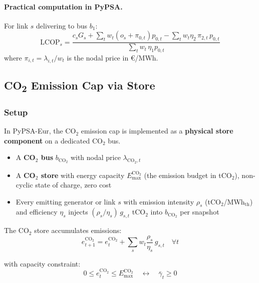 \documentclass{article}
\begin{document}
\paragraph{Practical computation in PyPSA.}
For link $s$ delivering to bus $b_1$:
\begin{equation}
    \text{LCOP}_s =
    \frac{c_s G_s + \displaystyle\sum_t w_t (o_s + \pi_{0,t}) p_{0,t}
          - \displaystyle\sum_t w_t \eta_2\, \pi_{2,t}\, p_{0,t}}
         {\displaystyle\sum_t w_t\, \eta_1 p_{0,t}}
\end{equation}
where $\pi_{i,t} = \lambda_{i,t}/w_t$ is the nodal price in \euro/MWh.

\subsection{CO\textsubscript{2} Emission Cap via Store}
\label{sec:co2store}

\subsubsection{Setup}

In PyPSA-Eur, the CO$_2$ emission cap is implemented as a \textbf{physical store
component} on a dedicated CO$_2$ bus.

\begin{itemize}
    \item A \textbf{CO$_2$ bus} $b_{\text{CO}_2}$ with nodal price
          $\lambda_{\text{CO}_2, t}$
    \item A \textbf{CO$_2$ store} with energy capacity $E^{\text{CO}_2}_{\max}$
          (the emission budget in tCO$_2$), non-cyclic state of charge, zero cost
    \item Every emitting generator or link $s$ with emission intensity
          $\rho_s$ (tCO$_2$/MWh$_{\text{th}}$) and efficiency $\eta_s$ injects
          $(\rho_s / \eta_s)\, g_{s,t}$ tCO$_2$ into $b_{\text{CO}_2}$ per snapshot
\end{itemize}

The CO$_2$ store accumulates emissions:
\begin{equation}
    e^{\text{CO}_2}_{t+1} = e^{\text{CO}_2}_t
        + \sum_s w_t \frac{\rho_s}{\eta_s}\, g_{s,t}
    \quad \forall t
    \label{eq:co2_soe}
\end{equation}

with capacity constraint:
\begin{equation}
    0 \le e^{\text{CO}_2}_t \le E^{\text{CO}_2}_{\max}
    \quad \longleftrightarrow \quad \bar{\gamma}_t \ge 0
    \label{eq:co2_cap}
\end{equation}
\end{document}
